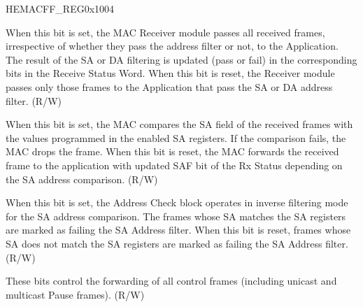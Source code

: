 \begin{register}{H}{EMACFF\_REG}{0x1004}\label{regdesc:EMACFFREG}
%
%
%
%
%
%
%
%
%
%
\regnewline%
\begin{regdesc}\begin{reglist}
\item [RECEIVE\_ALL]When this bit is set, the MAC Receiver module passes all received frames, irrespective of whether they pass the address filter or not, to the Application. The result of the SA or DA filtering is updated (pass or fail) in the corresponding bits in the Receive Status Word. When this bit is reset, the Receiver module passes only those frames to the Application that pass the SA or DA address filter. (R/W)
\item [SAFE]When this bit is set, the MAC compares the SA field of the received frames with the values programmed in the enabled SA registers. If the comparison fails, the MAC drops the frame. When this bit is reset, the MAC forwards the received frame to the application with updated SAF bit of the Rx Status depending on the SA address comparison. (R/W)
\item [SAIF]When this bit is set, the Address Check block operates in inverse filtering mode for the SA address comparison. The frames whose SA matches the SA registers are marked as failing the SA Address filter. When this bit is reset, frames whose SA does not match the SA registers are marked as failing the SA Address filter. (R/W)
\item [PCF]These bits control the forwarding of all control frames (including unicast and multicast Pause frames). (R/W)


\end{reglist}
\end{regdesc}
\end{register}
